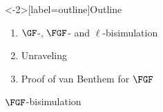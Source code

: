 \documentclass[aspectratio=169]{beamer}
\begin{document}
{
\addtocounter{framenumber}{100}
\begin{frame}<-2>[label=outline]{Outline}%
  \begin{center}
  \begin{enumerate}
    \item<alert@2| check@3-> $\GF$-, $\FGF$- and $\ell$-bisimulation
    \item<alert@3| check@4-> Unraveling
    \item<alert@4| check@5> Proof of van Benthem for $\FGF$ %
  \end{enumerate}
  \end{center}

\end{frame}
\addtocounter{framenumber}{-101}
}

%     

\begin{frame}{$\FGF$-bisimulation}
  
\end{frame}
\end{document}
